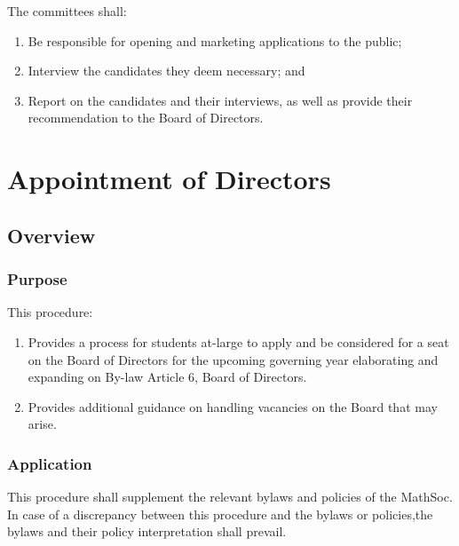 The committees shall: 
\begin{enumerate}
    \item Be responsible for opening and marketing applications to the public;
    \item Interview the candidates they deem necessary; and
    \item Report on the candidates and their interviews, as well as provide their recommendation to the Board of Directors. 
\end{enumerate}

\section{Appointment of Directors}
\subsection{Overview}
\subsubsection{Purpose}
This procedure:
\begin{enumerate}
    \item Provides a process for students at-large to apply and be considered for a seat on the 
        Board of Directors for the upcoming governing year elaborating and expanding on By-law Article 6, 
        Board of Directors.
    \item Provides additional guidance on handling vacancies on the Board that may arise. 
\end{enumerate}

\subsubsection{Application}
This procedure shall supplement the relevant bylaws and policies of the MathSoc. 
In case of a discrepancy between this procedure and the bylaws or policies,the bylaws and their policy interpretation shall prevail.

